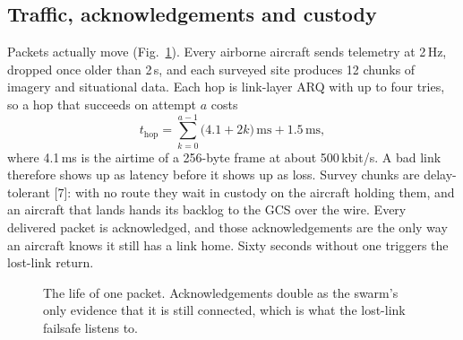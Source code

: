 \documentclass[10pt,a4paper,twocolumn]{article}
\begin{document}
\subsection{Traffic, acknowledgements and custody}
Packets actually move (Fig.~\ref{fig:traffic}). Every airborne aircraft sends telemetry at 2\,Hz, dropped once older than 2\,s, and each surveyed site produces 12 chunks of imagery and situational data. Each hop is link-layer ARQ with up to four tries, so a hop that succeeds on attempt $a$ costs
\begin{equation}
t_{\mathrm{hop}}=\sum_{k=0}^{a-1}\big(4.1+2k\big)\,\mathrm{ms}+1.5\,\mathrm{ms},
\label{eq:arq}
\end{equation}
where 4.1\,ms is the airtime of a 256-byte frame at about 500\,kbit/s. A bad link therefore shows up as latency before it shows up as loss. Survey chunks are delay-tolerant [7]: with no route they wait in custody on the aircraft holding them, and an aircraft that lands hands its backlog to the GCS over the wire. Every delivered packet is acknowledged, and those acknowledgements are the only way an aircraft knows it still has a link home. Sixty seconds without one triggers the lost-link return.

\begin{figure}[t]
\centering
{}
\caption{The life of one packet. Acknowledgements double as the swarm's only evidence that it is still connected, which is what the lost-link failsafe listens to.}
\label{fig:traffic}
\end{figure}
\end{document}
